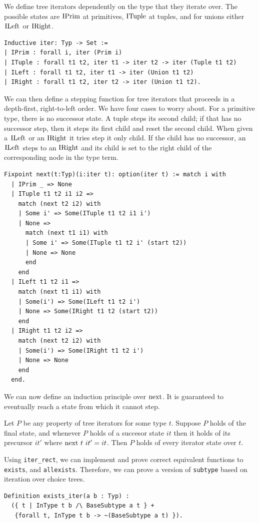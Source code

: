 \documentclass[a4paper,english]{lipics-v2019}
\renewcommand{\c}[1]{\ensuremath{\text{\lstinline{#1}}}\xspace}
\begin{document}
\noindent
We define tree iterators dependently on the type that they iterate over. The
possible states are \c{IPrim} at primitives, \c{ITuple} at tuples, and for
unions either \c{ILeft} or \c{IRight}.

\begin{lstlisting}
Inductive iter: Typ -> Set :=
| IPrim : forall i, iter (Prim i)
| ITuple : forall t1 t2, iter t1 -> iter t2 -> iter (Tuple t1 t2)
| ILeft : forall t1 t2, iter t1 -> iter (Union t1 t2)
| IRight : forall t1 t2, iter t2 -> iter (Union t1 t2).
\end{lstlisting}

We can then define a stepping function for tree iterators that proceeds in a
depth-first, right-to-left order.  We have four cases to worry about. For a
primitive type, there is no successor state. A tuple steps its second child;
if that has no successor step, then it steps its first child and reset the
second child. When given a \c{ILeft} or an \c{IRight} it tries step it only
child. If the child has no successor, an \c{ILeft} steps to an \c{IRight}
and its child is set to the right child of the corresponding node in the
type term.

\begin{lstlisting}
Fixpoint next(t:Typ)(i:iter t): option(iter t) := match i with
  | IPrim _ => None
  | ITuple t1 t2 i1 i2 =>
    match (next t2 i2) with
    | Some i' => Some(ITuple t1 t2 i1 i')
    | None =>
      match (next t1 i1) with
      | Some i' => Some(ITuple t1 t2 i' (start t2))
      | None => None
      end
    end
  | ILeft t1 t2 i1 =>
    match (next t1 i1) with
    | Some(i') => Some(ILeft t1 t2 i')
    | None => Some(IRight t1 t2 (start t2))
    end
  | IRight t1 t2 i2 => 
    match (next t2 i2) with
    | Some(i') => Some(IRight t1 t2 i')
    | None => None
    end
  end.
\end{lstlisting}

We can now define an induction principle over \c{next}. It is guaranteed to
eventually reach a state from which it cannot step.

\begin{theorem}
Let $P$ be any property of tree iterators for some type $t$.  Suppose $P$
holds of the final state, and whenever $P$ holds of a succesor state $it$
then it holds of its precursor $it'$ where $\c{next}~t~it' = it$.  Then $P$
holds of every iterator state over $t$.
\end{theorem} 


Using \verb|iter_rect|, we can implement and prove correct equivalent functions
to \verb|exists|, and \verb|allexists|. Therefore, we can prove a version of \verb|subtype|
based on iteration over choice trees.
\begin{small}\begin{verbatim}
Definition exists_iter(a b : Typ) : 
  ({ t | InType t b /\ BaseSubtype a t } +
   {forall t, InType t b -> ~(BaseSubtype a t) }).
\end{verbatim}\end{small}
\end{document}
